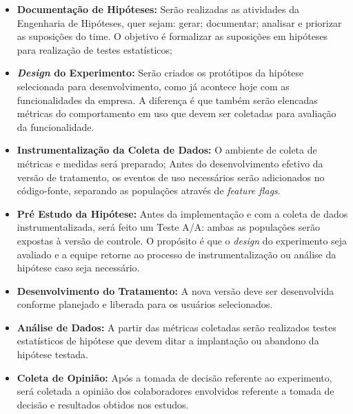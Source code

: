 \begin{itemize}
    \item \textbf{Documentação de Hipóteses:} Serão realizadas as atividades da Engenharia de Hipóteses, quer sejam: gerar; documentar; analisar e priorizar as suposições do time. O objetivo é formalizar as suposições em hipóteses para realização de testes estatísticos;
    
    \item \textbf{\textit{Design} do Experimento:} Serão criados os protótipos da hipótese selecionada para desenvolvimento, como já acontece hoje com as funcionalidades da empresa. A diferença é que também serão elencadas métricas do comportamento em uso que devem ser coletadas para avaliação da funcionalidade.

    \item \textbf{Instrumentalização da Coleta de Dados:} O ambiente de coleta de métricas e medidas será preparado; Antes do desenvolvimento efetivo da versão de tratamento, os eventos de uso necessários serão adicionados no código-fonte, separando as populações através de \textit{feature flags}.

    \item \textbf{Pré Estudo da Hipótese:} Antes da implementação e com a coleta de dados instrumentalizada, será feito um Teste A/A: ambas as populações serão expostas à versão de controle. O propósito é que o \textit{design} do experimento seja avaliado e a equipe retorne ao processo de instrumentalização ou análise da hipótese caso seja necessário.

    \item \textbf{Desenvolvimento do Tratamento:} A nova versão deve ser desenvolvida conforme planejado e liberada para os usuários selecionados.

    \item \textbf{Análise de Dados:} A partir das métricas coletadas serão realizados testes estatísticos de hipótese que devem ditar a implantação ou abandono da hipótese testada.

    \item \textbf{Coleta de Opinião:} Após a tomada de decisão referente ao experimento, será coletada a opinião dos colaboradores envolvidos referente a tomada de decisão e resultados obtidos nos estudos.
\end{itemize}


